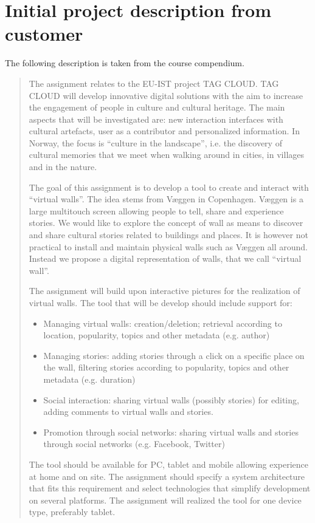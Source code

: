 \documentclass[11pt]{book}
\begin{document}


\appendix
\chapter{Initial project description from customer}
The following description is taken from the course compendium\cite[p. 47]{compendium}.

\begin{quotation}\noindent
The assignment relates to the EU-IST project TAG CLOUD. TAG CLOUD will develop innovative digital solutions with the aim to increase the engagement of people in culture and cultural heritage. The main aspects that will be investigated are: new interaction interfaces with cultural artefacts, user as a contributor and personalized information. In Norway, the focus is ``culture in the landscape'', i.e. the discovery of cultural memories that we meet when walking around in cities, in villages and in the nature.

The goal of this assignment is to develop a tool to create and interact with ``virtual walls''. The idea stems from Væggen in Copenhagen. Væggen is a large multitouch screen allowing people to tell, share and experience stories. We would like to explore the concept of wall as means to discover and share cultural stories related to buildings and places. It is however not practical to install and maintain physical walls such as Væggen all around. Instead we propose a digital representation of walls, that we call ``virtual wall''.

The assignment will build upon interactive pictures for the realization of virtual walls. The tool that will be develop should include support for:
\begin{itemize}
    \item Managing virtual walls: creation/deletion; retrieval according to location, popularity, topics and other metadata (e.g. author)
    \item Managing stories: adding stories through a click on a specific place on the wall, filtering stories
according to popularity, topics and other metadata (e.g. duration)
    \item Social interaction: sharing virtual walls (possibly stories) for editing, adding comments to virtual walls and stories.
    \item Promotion through social networks: sharing virtual walls and stories through social networks (e.g. Facebook, Twitter)
\end{itemize}
The tool should be available for PC, tablet and mobile allowing experience at home and on site. The assignment should specify a system architecture that fits this requirement and select technologies that simplify development on several platforms. The assignment will realized the tool for one device type, preferably tablet.


\end{quotation}
\end{document}
